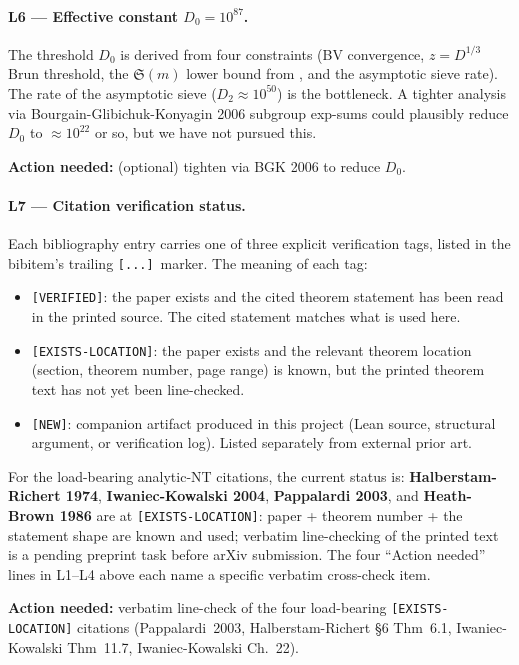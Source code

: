 \documentclass[11pt,a4paper]{article}
\theoremstyle{plain}
\theoremstyle{definition}
\theoremstyle{remark}
\begin{document}
\paragraph{L6 --- Effective constant $D_{0} = 10^{87}$.}
The threshold $D_{0}$ is derived from four constraints (BV
convergence, $z = D^{1/3}$ Brun threshold, the $\mathfrak{S}(m)$ lower
bound from \cite{WilderChain103}, and the asymptotic sieve rate). The
rate of the asymptotic sieve ($D_{2} \approx 10^{50}$) is the
bottleneck. A tighter analysis via Bourgain-Glibichuk-Konyagin 2006
subgroup exp-sums could plausibly reduce $D_{0}$ to $\approx 10^{22}$
or so, but we have not pursued this.

\textbf{Action needed:} (optional) tighten via BGK 2006 to reduce
$D_{0}$.

\paragraph{L7 --- Citation verification status.}
Each bibliography entry carries one of three explicit verification
tags, listed in the bibitem's trailing \texttt{[...]}~marker. The
meaning of each tag:
\begin{itemize}
  \item \texttt{[VERIFIED]}: the paper exists and the cited theorem
    statement has been read in the printed source. The cited statement
    matches what is used here.
  \item \texttt{[EXISTS-LOCATION]}: the paper exists and the relevant
    theorem location (section, theorem number, page range) is known,
    but the printed theorem text has not yet been line-checked.
  \item \texttt{[NEW]}: companion artifact produced in this project
    (Lean source, structural argument, or verification log). Listed
    separately from external prior art.
\end{itemize}
For the load-bearing analytic-NT citations, the current status is:
\textbf{Halberstam-Richert 1974}, \textbf{Iwaniec-Kowalski 2004},
\textbf{Pappalardi 2003}, and \textbf{Heath-Brown 1986} are at
\texttt{[EXISTS-LOCATION]}: paper + theorem number + the statement
shape are known and used; verbatim line-checking of the printed text
is a pending preprint task before arXiv submission. The four
``Action needed'' lines in L1--L4 above each name a specific
verbatim cross-check item.

\textbf{Action needed:} verbatim line-check of the four load-bearing
\texttt{[EXISTS-LOCATION]} citations (Pappalardi~2003, Halberstam-Richert
\S6 Thm~6.1, Iwaniec-Kowalski Thm~11.7, Iwaniec-Kowalski Ch.~22).
\end{document}
